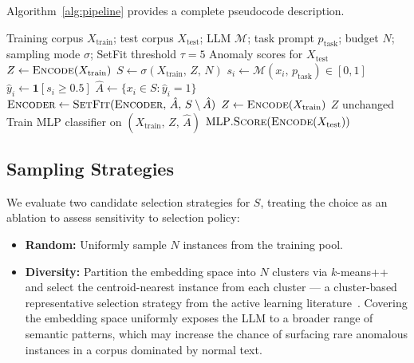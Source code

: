 \documentclass[12pt]{article}
\begin{document}
Algorithm~\ref{alg:pipeline} provides a complete pseudocode description.

\begin{algorithm}[ht]
\caption{Zero-Cost LLM Supervision Pipeline}
\label{alg:pipeline}
\begin{algorithmic}[1]
\Require Training corpus $X_{\text{train}}$; test corpus $X_{\text{test}}$; LLM $\mathcal{M}$;
         task prompt $p_{\text{task}}$; budget $N$; sampling mode $\sigma$;
         SetFit threshold $\tau = 5$
\Ensure  Anomaly scores for $X_{\text{test}}$
\State $Z \gets \textsc{Encode}(X_{\text{train}})$ 
\State $S \gets \sigma(X_{\text{train}},\, Z,\, N)$ 
    \State $s_i \gets \mathcal{M}(x_i,\, p_{\text{task}}) \in [0,1]$ 
    \State $\hat{y}_i \gets \mathbf{1}[s_i \geq 0.5]$
\EndFor
\State $\hat{A} \gets \{x_i \in S : \hat{y}_i = 1\}$ 
    \State $\textsc{Encoder} \gets \textsc{SetFit}(\textsc{Encoder},\, \hat{A},\, S \setminus \hat{A})$
    \State $Z \gets \textsc{Encode}(X_{\text{train}})$ 
\Else
    \State $Z$ unchanged 
\EndIf
\State Train MLP classifier on $(X_{\text{train}},\, Z,\, \hat{A})$
\State \Return $\text{MLP}.\textsc{Score}(\textsc{Encode}(X_{\text{test}}))$
\end{algorithmic}
\end{algorithm}

\subsection{Sampling Strategies}
\label{sec:sampling}

We evaluate two candidate selection strategies for $S$, treating the choice
as an ablation to assess sensitivity to selection policy:

\begin{itemize}
    \item \textbf{Random:} Uniformly sample $N$ instances from the training pool.
    \item \textbf{Diversity:} Partition the embedding space into $N$ clusters via
          $k$-means++ and select the centroid-nearest instance from each cluster ---
          a cluster-based representative selection strategy from the active learning
          literature~\cite{settles2009active,sener2018active}. Covering the embedding
          space uniformly exposes the LLM to a broader range of semantic patterns,
          which may increase the chance of surfacing rare anomalous instances in a
          corpus dominated by normal text.
\end{itemize}
\end{document}

